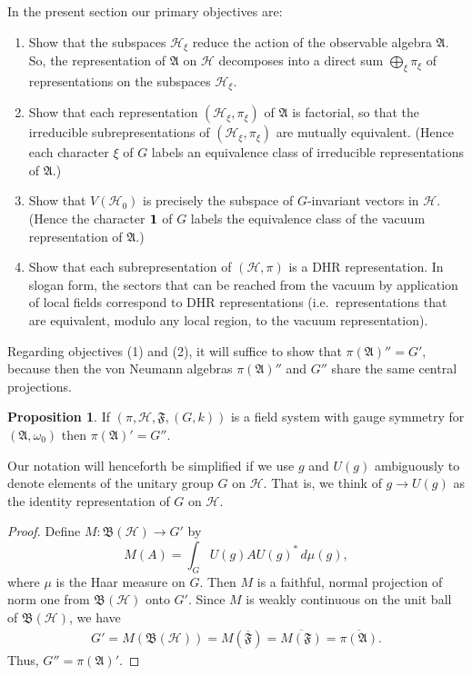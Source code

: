 \documentclass[12pt]{article}
\newcommand{\alg}[1]{\mathfrak{#1}}
\newcommand{\bh}{\mathfrak{B}(\mathcal{H})}
\theoremstyle{definition}
\newtheorem{prop}[thm]{Proposition}
\theoremstyle{definition}
\theoremstyle{remark}
\def\2#1{{\mathcal #1}}
\def\1#1{{\bf #1}}
\def\al#1{{\mathfrak #1}}
\def\om{\omega} \def\Om{\Omega} \def\dd{\partial} \def\D{\Delta}
\newcommand{\fields}{(\pi ,\2H ,\alg{F},(G,k))}
\begin{document}
In the present section our primary objectives are:
\begin{enumerate}
\item Show that the subspaces $\2H _{\xi}$ reduce the action of the
  observable algebra $\al A$.  So, the representation of $\al A$ on
  $\2H$ decomposes into a direct sum $\bigoplus _{\xi}\pi _{\xi}$ of
  representations on the subspaces $\2H _\xi$.
\item Show that each representation $(\2H _\xi ,\pi
  _{\xi})$ of $\al A$ is factorial, so that the
  irreducible subrepresentations of $(\2H _\xi ,\pi
  _\xi )$ are mutually equivalent.  (Hence each
  character $\xi$ of $G$ labels an equivalence class of
  irreducible representations of $\al A$.)
\item Show that $V(\2H _0)$ is precisely the subspace of $G$-invariant
  vectors in $\2H$.  (Hence the character $\11$ of $G$ labels the
  equivalence class of the vacuum representation of $\al A$.)
\item Show that each subrepresentation of $(\2H ,\pi )$
  is a DHR representation.  In slogan form, the sectors
  that can be reached from the vacuum by application of
  local fields correspond to DHR representations (i.e.\
  representations that are equivalent, modulo any local
  region, to the vacuum representation).
\end{enumerate}

Regarding objectives (1) and (2), it will suffice to show that $\pi
(\al A)''=G'$, because then the von Neumann algebras $\pi (\al A)''$
and $G''$ share the same central projections.

\begin{prop} If $\fields$ is a field system with gauge
  symmetry for $(\alg{A},\om _0)$ then $\pi (\al
  A)'=G''$.
\end{prop}

Our notation will henceforth be simplified if we use $g$ and $U(g)$
ambiguously to denote elements of the unitary group $G$ on $\2H$.
That is, we think of $g\to U(g)$ as the identity representation of $G$
on $\2H$.

\begin{proof} Define $M:\bh \to G'$ by
  \[ M(A)=\int _{G}U(g)AU(g)^{*}\, d\mu (g) ,\] where
  $\mu$ is the Haar measure on $G$.  Then $M$ is a
  faithful, normal projection of norm one from $\bh$
  onto $G'$.  Since $M$ is weakly continuous on the
  unit ball of $\bh$, we have
  \begin{eqnarray} G'=M(\bh )=M(\overline{\alg{F}})=\overline{M(\al
      F)} = \overline{\pi (\al A)}. \end{eqnarray} Thus, $G''=\pi
  (\alg{A})'$.
\end{proof}
\end{document}
